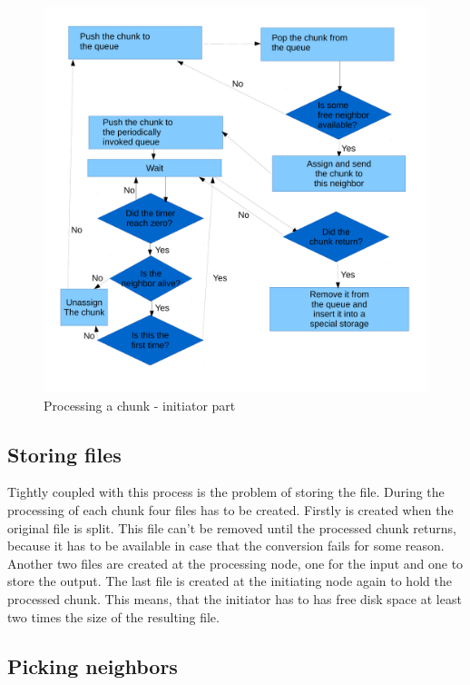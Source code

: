 \begin{figure}[h]
\begin{center}
\includegraphics[scale=0.40]{./img/workflow_chunks.pdf}
\caption{Processing a chunk - initiator part}
\end{center}
\end{figure}

\subsection*{Storing files}

Tightly coupled with this process is the problem of storing the file.
During the processing of each chunk four files has to be created.
Firstly is created when the original file is split. This file can't be
removed until the processed chunk returns, because it has to be
available in case that the conversion fails for some reason. Another two
files are created at the processing node, one for the input and one to
store the output. The last file is created at the initiating node again
to hold the processed chunk. This means, that the initiator has to has
free disk space at least two times the size of the resulting file.

\subsection*{Picking neighbors}


